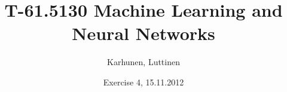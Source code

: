 \title{T-61.5130 Machine Learning and Neural Networks}
\author{Karhunen, Luttinen}
\date{Exercise 4, 15.11.2012}


\newcommand{\vect}[1]{{\bf{#1}}}
\newcommand{\svect}[1]{\boldsymbol{#1}}
\newcommand{\matr}[1]{\boldsymbol{#1}}




\maketitle

